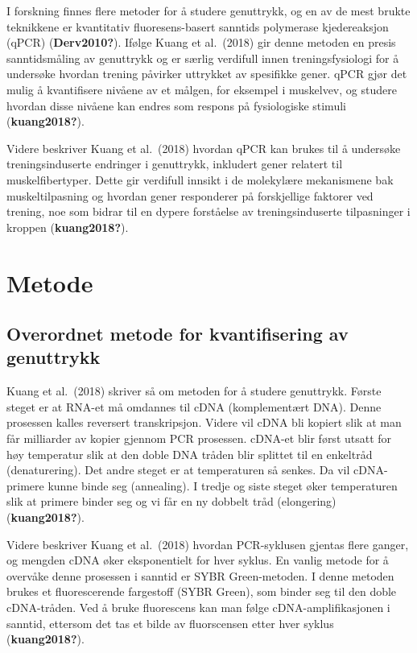 \documentclass[
  letterpaper,
  DIV=11,
  numbers=noendperiod]{scrreprt}
\begin{document}
I forskning finnes flere metoder for å studere genuttrykk, og en av de
mest brukte teknikkene er kvantitativ fluoresens-basert sanntids
polymerase kjedereaksjon (qPCR) (\textbf{Derv2010?}). Ifølge Kuang et
al.~(2018) gir denne metoden en presis sanntidsmåling av genuttrykk og
er særlig verdifull innen treningsfysiologi for å undersøke hvordan
trening påvirker uttrykket av spesifikke gener. qPCR gjør det mulig å
kvantifisere nivåene av et målgen, for eksempel i muskelvev, og studere
hvordan disse nivåene kan endres som respons på fysiologiske stimuli
(\textbf{kuang2018?}).

Videre beskriver Kuang et al.~(2018) hvordan qPCR kan brukes til å
undersøke treningsinduserte endringer i genuttrykk, inkludert gener
relatert til muskelfibertyper. Dette gir verdifull innsikt i de
molekylære mekanismene bak muskeltilpasning og hvordan gener responderer
på forskjellige faktorer ved trening, noe som bidrar til en dypere
forståelse av treningsinduserte tilpasninger i kroppen
(\textbf{kuang2018?}).

\section{Metode}\label{metode-5}

\subsection{Overordnet metode for kvantifisering av
genuttrykk}\label{overordnet-metode-for-kvantifisering-av-genuttrykk}

Kuang et al.~(2018) skriver så om metoden for å studere genuttrykk.
Første steget er at RNA-et må omdannes til cDNA (komplementært DNA).
Denne prosessen kalles reversert transkripsjon. Videre vil cDNA bli
kopiert slik at man får milliarder av kopier gjennom PCR prosessen.
cDNA-et blir først utsatt for høy temperatur slik at den doble DNA
tråden blir splittet til en enkeltråd (denaturering). Det andre steget
er at temperaturen så senkes. Da vil cDNA-primere kunne binde seg
(annealing). I tredje og siste steget øker temperaturen slik at primere
binder seg og vi får en ny dobbelt tråd (elongering)
(\textbf{kuang2018?}).

Videre beskriver Kuang et al.~(2018) hvordan PCR-syklusen gjentas flere
ganger, og mengden cDNA øker eksponentielt for hver syklus. En vanlig
metode for å overvåke denne prosessen i sanntid er SYBR Green-metoden. I
denne metoden brukes et fluorescerende fargestoff (SYBR Green), som
binder seg til den doble cDNA-tråden. Ved å bruke fluorescens kan man
følge cDNA-amplifikasjonen i sanntid, ettersom det tas et bilde av
fluorscensen etter hver syklus (\textbf{kuang2018?}).
\end{document}
